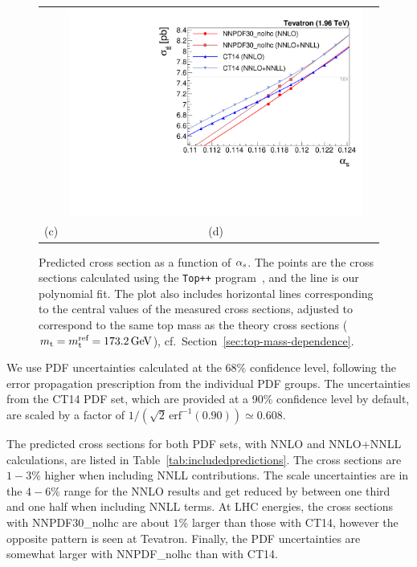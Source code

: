 \begin{figure}[t]
\begin{tabular}{ccc}
&
\includegraphics[width=\FitFigureWidth\linewidth]{img/alphas/fits_TEV1960.pdf}
\\[-8pt]
(c) & (d) \\[6pt]
\end{tabular}
\vspace{-0.3cm}
\caption{
  Predicted cross section as a function of $\alpha_s$. The points are the cross
  sections calculated using the \texttt{Top++} program~\cite{topplusplus}, and
  the line is our polynomial fit.
  The plot also includes horizontal lines corresponding to the central
  values of the measured cross sections, adjusted to correspond to the
  same top mass as the theory cross sections ($m_\mathrm{t} = m_\mathrm{t}^\text{ref} =
  173.2\,\text{GeV}$), cf.~Section~\ref{sec:top-mass-dependence}.
}
\label{fig:FitsToPrediction}
\end{figure}
% 

We use PDF uncertainties calculated at the 68\% confidence level,
following the error propagation prescription from the individual PDF
groups.
%
The uncertainties from the CT14 PDF set, which are provided at a 90\%
confidence level by default, are scaled by a factor of
$1/(\sqrt2 \, \text{erf}^{-1}( 0.90) )\simeq 0.608 $.

The predicted cross sections for both PDF sets, with NNLO and
NNLO+NNLL calculations, are listed in
Table~\ref{tab:includedpredictions}.
%
The cross sections are $1{-}3\%$ higher when including NNLL
contributions.
%
The scale uncertainties are in the $4{-}6\%$ range for the NNLO
results and get reduced by between one third and one half when
including NNLL terms.
%
At LHC energies, the cross sections with NNPDF30\_nolhc are about $1\%$ larger
than those with CT14, however the opposite pattern is seen at
Tevatron. 
%
Finally, the PDF uncertainties are somewhat larger with NNPDF\_nolhc than
with CT14.

